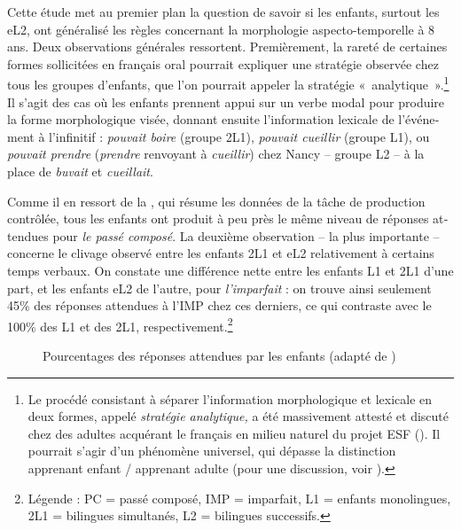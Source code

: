 \documentclass[french, output=paper]{langscibook}
\begin{document}
\begin{otherlanguage}{french}
Cette étude met au premier plan la question de savoir si les enfants, surtout les eL2, ont généralisé les règles concernant la morphologie aspecto-temporelle à 8 ans. Deux observations générales ressortent. Premièrement, la rareté de certaines formes sollicitées en français oral pourrait expliquer une stratégie observée chez tous les groupes d’enfants, que l’on pourrait appeler la stratégie «~analytique~».\footnote{Le procédé consistant à séparer l’information morphologique et lexicale en deux formes, appelé \textit{stratégie analytique,} a été massivement attesté et discuté chez des adultes acquérant le français en milieu naturel du projet ESF (\citealt{BenazzoStarren2007, Véronique2009}). Il pourrait s’agir d’un phénomène universel, qui dépasse la distinction apprenant enfant / apprenant adulte (pour une discussion, voir \citealt{KihlstedtSchlyter2009}).} Il s’agit des cas où les enfants prennent appui sur un verbe modal pour produire la forme morphologique visée, donnant ensuite l’information lexicale de l’événement à l’infinitif : \textit{pouvait boire} (groupe 2L1), \textit{pouvait cueillir} (groupe L1), ou \textit{pouvait prendre} (\textit{prendre} renvoyant à \textit{cueillir}) chez Nancy -- groupe L2 -- à la place de \textit{buvait} et \textit{cueillait}. 



Comme il en ressort de la , qui résume les données de la tâche de production contrôlée, tous les enfants ont produit à peu près le même niveau de réponses attendues pour \textit{le passé composé}. La deuxième observation -- la plus importante -- concerne le clivage observé entre les enfants 2L1 et eL2 relativement à certains temps verbaux. On constate une différence nette entre les enfants L1 et 2L1 d’une part, et les enfants eL2 de l’autre, pour \textit{l’imparfait} : on trouve ainsi seulement 45\% des réponses attendues à l’IMP chez ces derniers, ce qui  contraste avec le 100\% des L1 et des 2L1, respectivement.\footnote{Légende : PC = passé composé, IMP = imparfait, L1 = enfants monolingues, 2L1 = bilingues simultanés, L2 = bilingues successifs.}



\begin{figure}
\caption{\label{fig:kihlstedt:3}Pourcentages des réponses attendues par les enfants (adapté de \citealt[103]{KihlstedtSchlyter2009})}
\end{figure}


\end{otherlanguage}
\end{document}
